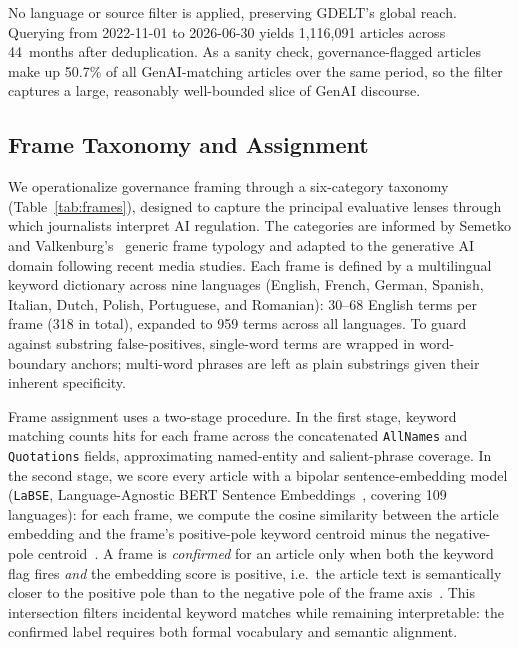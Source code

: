 \documentclass[sigconf]{acmart}
\begin{document}
No language or source filter is applied, preserving GDELT's global reach.
Querying from 2022-11-01 to 2026-06-30 yields 1,116,091 articles across 44~months after deduplication.
As a sanity check, governance-flagged articles make up 50.7\% of all GenAI-matching articles over the same period, so the filter captures a large, reasonably well-bounded slice of GenAI discourse.

\subsection{Frame Taxonomy and Assignment}
\label{sec:taxonomy}

We operationalize governance framing through a six-category taxonomy (Table~\ref{tab:frames}), designed to capture the principal evaluative lenses through which journalists interpret AI regulation.
The categories are informed by Semetko and Valkenburg's~\cite{semetko_framing_2000} generic frame typology and adapted to the generative AI domain following recent media studies.
Each frame is defined by a multilingual keyword dictionary across nine languages (English, French, German, Spanish, Italian, Dutch, Polish, Portuguese, and Romanian): 30--68 English terms per frame (318 in total), expanded to 959 terms across all languages.
To guard against substring false-positives, single-word terms are wrapped in word-boundary anchors; multi-word phrases are left as plain substrings given their inherent specificity.

Frame assignment uses a two-stage procedure.
In the first stage, keyword matching counts hits for each frame across the concatenated \texttt{AllNames} and \texttt{Quotations} fields, approximating named-entity and salient-phrase coverage.
In the second stage, we score every article with a bipolar sentence-embedding model (\texttt{LaBSE}, Language-Agnostic BERT Sentence Embeddings~\cite{feng_language-agnostic_2022}, covering 109 languages): for each frame, we compute the cosine similarity between the article embedding and the frame's positive-pole keyword centroid minus the negative-pole centroid~\cite{kwak_frameaxis_2021}.
A frame is \emph{confirmed} for an article only when both the keyword flag fires \emph{and} the embedding score is positive, i.e.\ the article text is semantically closer to the positive pole than to the negative pole of the frame axis~\cite{widmann_creating_2023}.
This intersection filters incidental keyword matches while remaining interpretable: the confirmed label requires both formal vocabulary and semantic alignment.
\end{document}

